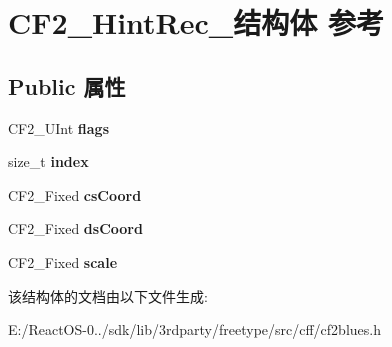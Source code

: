 \hypertarget{struct_c_f2___hint_rec__}{}\section{C\+F2\+\_\+\+Hint\+Rec\+\_\+结构体 参考}
\label{struct_c_f2___hint_rec__}
\subsection*{Public 属性}
\begin{DoxyCompactItemize}
\item 
\mbox{\label{struct_c_f2___hint_rec___ae0e657cd0bd47c45a27064c31c46f3f8}} 
C\+F2\+\_\+\+U\+Int {\bfseries flags}
\item 
\mbox{\label{struct_c_f2___hint_rec___a31ccf1531e554603c46adeb03617aa2d}} 
size\+\_\+t {\bfseries index}
\item 
\mbox{\label{struct_c_f2___hint_rec___ab330bb459b6c358dd2f9c3b703bfd1fa}} 
C\+F2\+\_\+\+Fixed {\bfseries cs\+Coord}
\item 
\mbox{\label{struct_c_f2___hint_rec___ae20696d8ca1279d25dbda1cde8635fb7}} 
C\+F2\+\_\+\+Fixed {\bfseries ds\+Coord}
\item 
\mbox{\label{struct_c_f2___hint_rec___a017bb4cc4d88980dc68aa62d9a5edbec}} 
C\+F2\+\_\+\+Fixed {\bfseries scale}
\end{DoxyCompactItemize}


该结构体的文档由以下文件生成\+:\begin{DoxyCompactItemize}
\item 
E\+:/\+React\+O\+S-\/0../sdk/lib/3rdparty/freetype/src/cff/cf2blues.\+h\end{DoxyCompactItemize}
